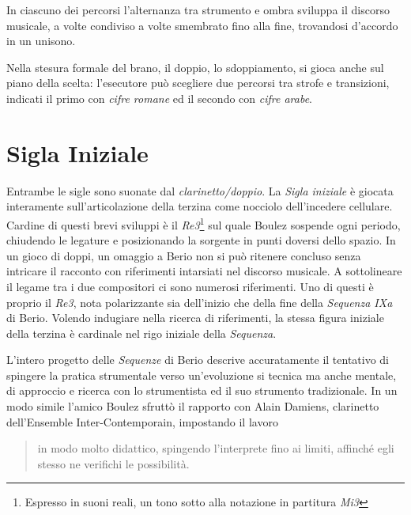
In ciascuno dei percorsi l'alternanza tra strumento e ombra sviluppa il discorso musicale, a volte condiviso a volte smembrato fino alla fine, trovandosi d'accordo in un unisono.

Nella stesura formale del brano, il doppio, lo sdoppiamento, si gioca anche sul piano della scelta: l'esecutore può scegliere due percorsi tra strofe e transizioni, indicati il primo con \emph{cifre romane} ed il secondo con \emph{cifre arabe}. %

\thispagestyle{fancy} %

\section*{Sigla Iniziale}

Entrambe le sigle sono suonate dal \emph{clarinetto/doppio}. La \emph{Sigla iniziale} è giocata interamente sull'articolazione della terzina come nocciolo dell'incedere cellulare. Cardine di questi brevi sviluppi è il \emph{Re3}\footnote{Espresso in suoni reali, un tono sotto alla notazione in partitura \emph{Mi3}} sul quale Boulez sospende ogni periodo, chiudendo le legature e posizionando la sorgente in punti doversi dello spazio. In un gioco di doppi, un omaggio a Berio non si può ritenere concluso senza intricare il racconto con riferimenti intarsiati nel discorso musicale. A sottolineare il legame tra i due compositori ci sono numerosi riferimenti. Uno di questi è proprio il \emph{Re3}, nota polarizzante sia dell'inizio che della fine della \emph{Sequenza IXa} di Berio.
Volendo indugiare nella ricerca di riferimenti, la stessa figura iniziale della terzina è cardinale nel rigo iniziale della \emph{Sequenza}. 

L'intero progetto delle \emph{Sequenze} di Berio descrive accuratamente il tentativo di spingere la pratica strumentale verso un'evoluzione si tecnica ma anche mentale, di approccio e ricerca con lo strumentista ed il suo strumento tradizionale. In un modo simile l'amico Boulez sfruttò il rapporto con Alain Damiens, clarinetto dell'Ensemble Inter-Contemporain, impostando il lavoro

\begin{quote}
{\small
in modo molto didattico, spingendo l'interprete fino ai limiti, affinché egli stesso ne verifichi le possibilità.
}
\end{quote}

